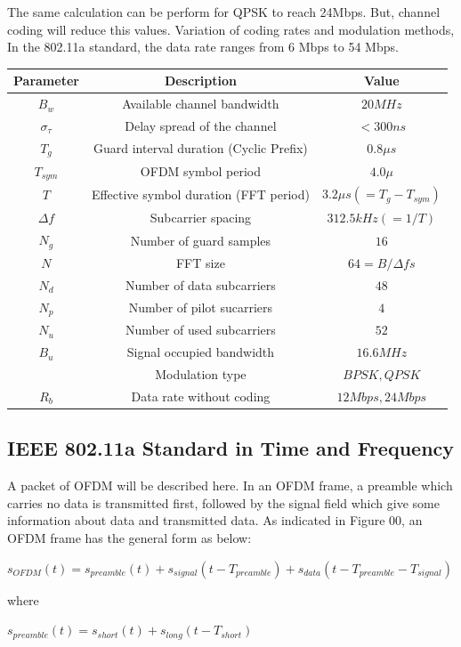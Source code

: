 The same calculation can be perform for QPSK to reach 24Mbps. But, channel coding will reduce this values. Variation of coding rates and modulation methods, In the 802.11a standard, the data rate ranges from 6 Mbps to 54 Mbps.\\

\begin{center}
\vspace{0.5cm}
\begin{tabular}{c|c|c}
Parameter&Description&Value\\ \hline
$B_{w}$&Available channel bandwidth&$20MHz$\\
$\sigma_{\tau}$&Delay spread of the channel& $<300 ns$\\
$T_{g}$&Guard interval duration (Cyclic Prefix)&$0.8\mu s$\\
$T_{sym}$&OFDM symbol period&$4.0\mu$\\
$T$&Effective symbol duration (FFT period)&$3.2\mu s (=T_{g}- T_{sym})$\\
$\Delta f$&Subcarrier spacing&$312.5kHz (=1/T)$\\
$N_{g}$&Number of guard samples&$16$\\
$N$&FFT size&$64= B/\Delta f s$\\
$N_{d}$&Number of data subcarriers&$48$\\
$N_{p}$&Number of pilot sucarriers&$4$\\
$N_{u}$&Number of used subcarriers&$52$\\
$B_{u}$&Signal occupied bandwidth&$16.6MHz$\\
&Modulation type&$BPSK, QPSK$\\
$R_{b}$&Data rate without coding&$12Mbps, 24Mbps$\\
\end{tabular}
\end{center}

\subsection{IEEE 802.11a Standard in Time and Frequency}
A packet of OFDM will be described here. In an OFDM frame, a preamble which carries no data is transmitted first, followed by the signal field which give some information about data and transmitted data. As indicated in Figure 00, an OFDM frame has the general form as below:
\begin{center}
$s_{OFDM}(t)= s_{preamble}(t)+ s_{signal}(t- T_{preamble})+ s_{data}(t- T_{preamble}- T_{signal})$\\
\end{center}
where\\
\begin{center}
$s_{preamble}(t)= s_{short}(t)+ s_{long}(t- T_{short})$\\
\end{center}

